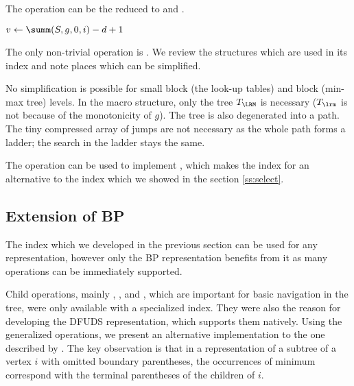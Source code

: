 The operation \bwdSearch{} can be the reduced to \fwdSearch{} and \summ{}.

\begin{algorithmic}
		\State $v \gets \summ(S, g, 0, i) - d + 1$
			\State {}
			\State {}
		\Else
			\State {}
		\EndIf
		\State {}
	\Else
		\State {}
	\EndIf
\EndFunction
\end{algorithmic}

The only non-trivial operation is \fwdSearch{}.
We review the structures which are used in its index and note places which can be simplified.

No simplification is possible for small block (the look-up tables) and block (min-max tree) levels.
In the macro structure, only the tree $T_{\LRM}$ is necessary ($T_{\lrm}$ is not because of the monotonicity of $g$).
The tree is also degenerated into a path.
The tiny compressed array of jumps are not necessary as the whole path forms a ladder; the search in the ladder stays the same.

The operation \fwdSearch{} can be used to implement \select{}, which makes the index for \fwdSearch{} an alternative to the index which we showed in the section \ref{ss:select}.

\begin{algorithmic}
	 
		\State {} 
		\State {}
	\Else
		\State {}
	\EndIf
\EndFunction
\end{algorithmic}

\subsection{Extension of BP}

The index which we developed in the previous section can be used for any representation, however only the BP representation benefits from it as many operations can be immediately supported.

Child operations, mainly \degree{}, \childRank{}, and \childSelect{}, which are important for basic navigation in the tree, were only available with a specialized index.
They were also the reason for developing the DFUDS representation, which supports them natively.
Using the generalized \rmq{} operations, we present an alternative implementation to the one described by \cite{sadakane2010fully}.
The key observation is that in a representation of a subtree of a vertex $i$ with omitted boundary parentheses, the occurrences of minimum correspond with the terminal parentheses of the children of $i$.

